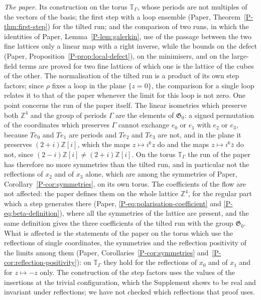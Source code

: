 \documentclass[11pt]{preprint}
\numberwithin{equation}{section}
\theoremstyle{definition}
\theoremstyle{remark}
\theoremstyle{plain}
\begin{document}
\emph{The paper.} Its construction on the torus $\mathbb T_\Gamma$, whose periods are not multiples of the vectors of the basis; the first step with a loop ensemble (Paper, Theorem~\ref{P-thm:first-step}) for the tilted run; and the comparison of two runs, in which the identities of Paper, Lemma~\ref{P-lem:galerkin}, use of the passage between the two fine lattices only a linear map with a right inverse, while the bounds on the defect (Paper, Proposition~\ref{P-prop:local-defect}), on the minimisers, and on the large-field terms are proved for two fine lattices of which one is the lattice of the cubes of the other. The normalisation of the tilted run is a product of its own step factors; since $\rho$ fixes a loop in the plane $\{ z = 0 \}$, the comparison for a single loop relates it to that of the paper whenever the limit for this loop is not zero. One point concerns the run of the paper itself. The linear isometries which preserve both $\mathbb Z^4$ and the group of periods $\Gamma$ are the elements of $\mathfrak G_0$: a signed permutation of the coordinates which preserves $\Gamma$ cannot exchange $e_0$ or $e_1$ with $e_2$ or $e_3$, because $Te_0$ and $Te_1$ are periods and $Te_2$ and $Te_3$ are not, and in the plane it preserves $(2 + i)\mathbb Z[i]$, which the maps $z \mapsto i^kz$ do and the maps $z \mapsto i^k\bar z$ do not, since $(2 - i)\mathbb Z[i] \neq (2 + i)\mathbb Z[i]$. On the torus $\mathbb T_\Gamma$ the run of the paper has therefore no more symmetries than the tilted run, and in particular not the reflections of $x_2$ and of $x_3$ alone, which are among the symmetries of Paper, Corollary~\ref{P-cor:symmetries}, on its own torus. The coefficients of the flow are not affected: the paper defines them on the whole lattice $\mathbb Z^4$, for the regular part which a step generates there (Paper, \eqref{P-eq:polarisation-coefficient} and \eqref{P-eq:beta-definition}), where all the symmetries of the lattice are present, and the same definition gives the three coefficients of the tilted run with the group $\mathfrak G_0$. What is affected is the statements of the paper on the torus which use the reflections of single coordinates, the symmetries and the reflection positivity of the limits among them (Paper, Corollaries~\ref{P-cor:symmetries} and~\ref{P-cor:reflection-positivity}): on $\mathbb T_\Gamma$ they hold for the reflections of $x_0$ and of $x_1$ and for $z \mapsto -z$ only. The construction of the step factors uses the values of the insertions at the trivial configuration, which the Supplement shows to be real and invariant under reflections; we have not checked which reflections that proof uses.



\end{document}

